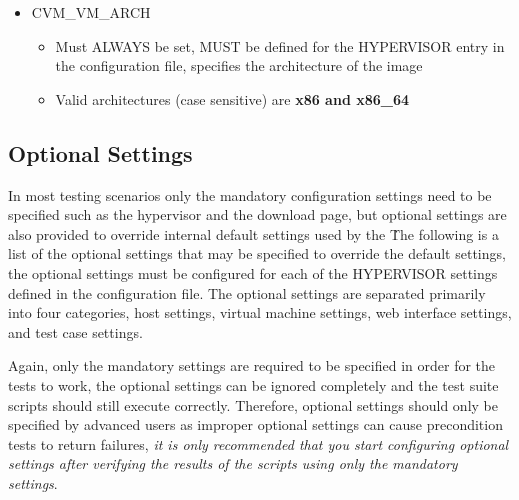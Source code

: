 \begin{itemize}
\item	CVM\_VM\_ARCH
		\begin{itemize}
		\item	Must ALWAYS be set, MUST be defined for the HYPERVISOR entry in the configuration
				file, specifies the architecture of the \cernvm image
		\item	Valid architectures (case sensitive) are {\bf x86 and x86\_64}
		\end{itemize}


\end{itemize}




\subsection{Optional Settings}
\label{sec:optionalsettings}

In most testing scenarios only the mandatory configuration settings need to be specified such as the hypervisor and 
the download page, but optional settings are also provided to override internal default settings used by the 
\cernvmtestframework\. The following is a list of the optional settings that may be specified to override the default
settings, the optional settings must be configured for each of the HYPERVISOR settings defined in the configuration file.
The optional settings are separated primarily into four categories, host settings, virtual machine settings, web interface
settings, and test case settings. 

Again, only the mandatory settings are required to be specified in order for the tests to work, the optional settings 
can be ignored completely and the test suite scripts should still execute correctly. Therefore, optional settings should
only be specified by advanced users as improper optional settings can cause precondition tests to return failures,
\emph{it is only recommended that you start configuring optional settings after verifying the results of the scripts 
using only the mandatory settings}.


